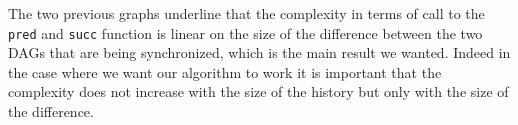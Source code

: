  The two previous graphs underline that the complexity in terms of call to the \texttt{pred} and \texttt{succ} function is linear on the size of the difference between the two DAGs that are being synchronized, which is the main result we wanted. Indeed in the case where we want our algorithm to work it is important that the complexity does not increase with the size of the history but only with the size of the difference.